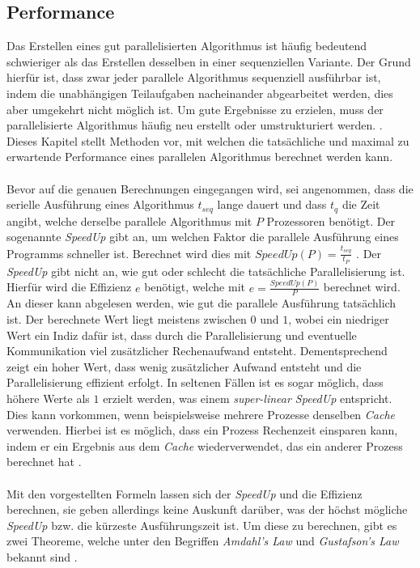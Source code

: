 \subsection{Performance}
\label{subsec:basics_performance}
Das Erstellen eines gut parallelisierten Algorithmus ist häufig bedeutend schwieriger als das Erstellen desselben in einer sequenziellen Variante. Der Grund hierfür ist, dass zwar jeder parallele Algorithmus sequenziell ausführbar ist, indem die unabhängigen Teilaufgaben nacheinander abgearbeitet werden, dies aber umgekehrt nicht möglich ist. Um gute Ergebnisse zu erzielen, muss der parallelisierte Algorithmus häufig neu erstellt oder umstrukturiert werden. \cite{nielsen2016introduction}. Dieses Kapitel stellt Methoden vor, mit welchen die tatsächliche und maximal zu erwartende Performance eines parallelen Algorithmus berechnet werden kann. 
\\\\
Bevor auf die genauen Berechnungen eingegangen wird, sei angenommen, dass die serielle Ausführung eines Algorithmus $t_{seq}$ lange dauert und dass $t_q$ die Zeit angibt, welche derselbe parallele Algorithmus mit $P$ Prozessoren benötigt. Der sogenannte \emph{SpeedUp} gibt an, um welchen Faktor die parallele Ausführung eines Programms schneller ist. Berechnet wird dies mit $SpeedUp(P)=\frac{t_{seq}}{t_P}$ \cite{nielsen2016introduction}. Der \emph{SpeedUp} gibt nicht an, wie gut oder schlecht die tatsächliche Parallelisierung ist. Hierfür wird die Effizienz $e$ benötigt, welche mit $e=\frac{SpeedUp(P)}{P}$ berechnet wird. An dieser kann abgelesen werden, wie gut die parallele Ausführung tatsächlich ist. Der berechnete Wert liegt meistens zwischen $0$ und $1$, wobei ein niedriger Wert ein Indiz dafür ist, dass durch die Parallelisierung und eventuelle Kommunikation viel zusätzlicher Rechenaufwand entsteht. Dementsprechend zeigt ein hoher Wert, dass wenig zusätzlicher Aufwand entsteht und die Parallelisierung effizient erfolgt. In seltenen Fällen ist es sogar möglich, dass höhere Werte als $1$ erzielt werden, was einem \emph{super-linear SpeedUp} entspricht. Dies kann vorkommen, wenn beispielsweise mehrere Prozesse denselben \emph{Cache} verwenden. Hierbei ist es möglich, dass ein Prozess Rechenzeit einsparen kann, indem er ein Ergebnis aus dem \emph{Cache} wiederverwendet, das ein anderer Prozess berechnet hat \cite{nielsen2016introduction}.
\\\\
Mit den vorgestellten Formeln lassen sich der \emph{SpeedUp} und die Effizienz berechnen, sie geben allerdings keine Auskunft darüber, was der höchst mögliche \emph{SpeedUp} bzw. die kürzeste Ausführungszeit ist. Um diese zu berechnen, gibt es zwei Theoreme, welche unter den Begriffen \emph{Amdahl's Law} und \emph{Gustafson's Law} bekannt sind \cite{nielsen2016introduction}. 
